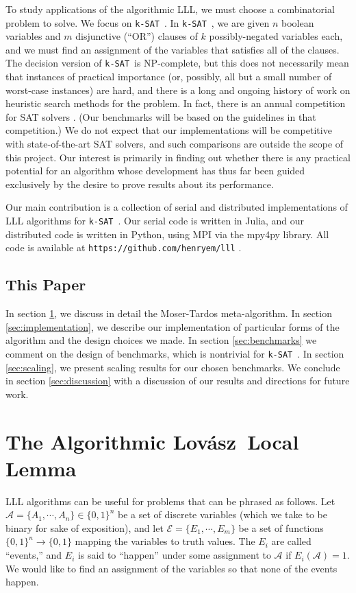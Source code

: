 \documentclass[twocolumn]{article}
\newcommand{\ksat}{\texttt{k-SAT}~}
\newcommand{\lovasz}{Lov\'{a}sz~}
\begin{document}
To study applications of the algorithmic LLL, we must choose a combinatorial problem to solve.  We focus on \ksat.  In \ksat, we are given $n$ boolean variables and $m$ disjunctive (``OR'') clauses of $k$ possibly-negated variables each, and we must find an assignment of the variables that satisfies all of the clauses.  The decision version of \ksat is NP-complete, but this does not necessarily mean that instances of practical importance (or, possibly, all but a small number of worst-case instances) are hard, and there is a long and ongoing history of work on heuristic search methods for the problem.  In fact, there is an annual competition for SAT solvers \cite{belov2014sat}.  (Our benchmarks will be based on the guidelines in that competition.)  We do not expect that our implementations will be competitive with state-of-the-art SAT solvers, and such comparisons are outside the scope of this project.  Our interest is primarily in finding out whether there is any practical potential for an algorithm whose development has thus far been guided exclusively by the desire to prove results about its performance.

Our main contribution is a collection of serial and distributed implementations of LLL algorithms for \ksat.  Our serial code is written in Julia, and our distributed code is written in Python, using MPI via the mpy4py library.  All code is available at \texttt{https://github.com/henryem/lll} .

\subsection{This Paper}
In section \ref{sec:alll}, we discuss in detail the Moser-Tardos meta-algorithm.  In section \ref{sec:implementation}, we describe our implementation of particular forms of the algorithm and the design choices we made.  In section \ref{sec:benchmarks} we comment on the design of benchmarks, which is nontrivial for \ksat.  In section \ref{sec:scaling}, we present scaling results for our chosen benchmarks.  We conclude in section \ref{sec:discussion} with a discussion of our results and directions for future work.

\section{The Algorithmic \lovasz Local Lemma}
\label{sec:alll}
LLL algorithms can be useful for problems that can be phrased as follows.  Let $\mathcal{A} = \{A_1, \cdots, A_n\} \in \{0,1\}^n$ be a set of discrete variables (which we take to be binary for sake of exposition), and let $\mathcal{E} = \{E_1, \cdots, E_m\}$ be a set of functions $\{0,1\}^n \to \{0,1\}$ mapping the variables to truth values.  The $E_i$ are called ``events,'' and $E_i$ is said to ``happen'' under some assignment to $\mathcal{A}$ if $E_i(\mathcal{A}) = 1$.  We would like to find an assignment of the variables so that none of the events happen.
\end{document}
